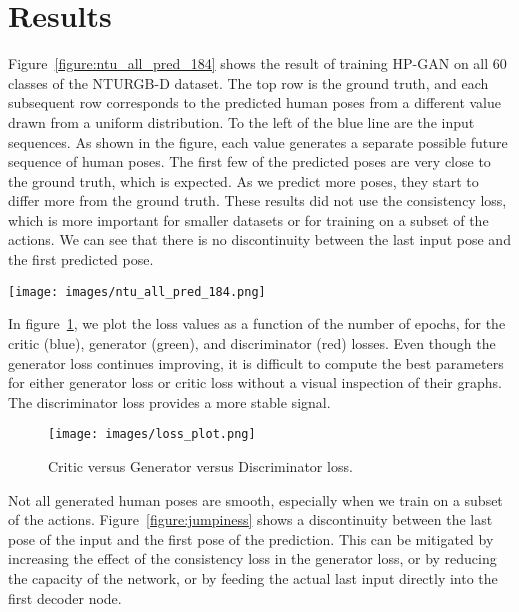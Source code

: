 \documentclass[10pt,twocolumn,letterpaper]{article}
\begin{document}
\section{Results}
Figure~\ref{figure:ntu_all_pred_184} shows the result of training HP-GAN on all 60 classes of the NTURGB-D dataset. The top row is the ground truth, and each subsequent row corresponds to the predicted human poses from a different  value drawn from a uniform distribution. To the left of the blue line are the input sequences. As shown in the figure, each  value generates a separate possible future sequence of human poses. The first few of the predicted poses are very close to the ground truth, which is expected. As we predict more poses, they start to differ more from the ground truth. These results did not use the consistency loss, which is more important for smaller datasets or for training on a subset of the actions. We can see that there is no discontinuity between the last input pose and the first predicted pose. 

\begin{figure*}[ht]
\centering
\texttt{[image: images/ntu\_all\_pred\_184.png]}
\caption{Training on all 60 classes from the NTURGB-D dataset, and then predicting 30 poses from 10 input poses. Top row is the ground truth, and each subsequent row corresponds to a random  value drawn from a uniform distribution. Poses to the left of the blue line are the input sequences. Pose to the right of the blue line, starting in the second row, are the predicted future poses for each  value.}
\label{figure:ntu_all_pred_184}
\end{figure*}

In figure~\ref{figure:loss-plot}, we plot the loss values as a function of the number of epochs, for the critic (blue), generator (green), and discriminator (red) losses. Even though the generator loss continues improving, it is difficult to compute the best parameters for either generator loss or critic loss without a visual inspection of their graphs. The discriminator loss provides a more stable signal.

\begin{figure}[H]
\centering
\texttt{[image: images/loss\_plot.png]}
\caption{Critic versus Generator versus Discriminator loss.}
\label{figure:loss-plot}
\end{figure}

Not all generated human poses are smooth, especially when we train on a subset of the actions. Figure~\ref{figure:jumpiness} shows a discontinuity between the last pose of the input and the first pose of the prediction. This can be mitigated by increasing the effect of the consistency loss in the generator loss, or by reducing the capacity of the network, or by feeding the actual last input directly into the first decoder node.
\end{document}
